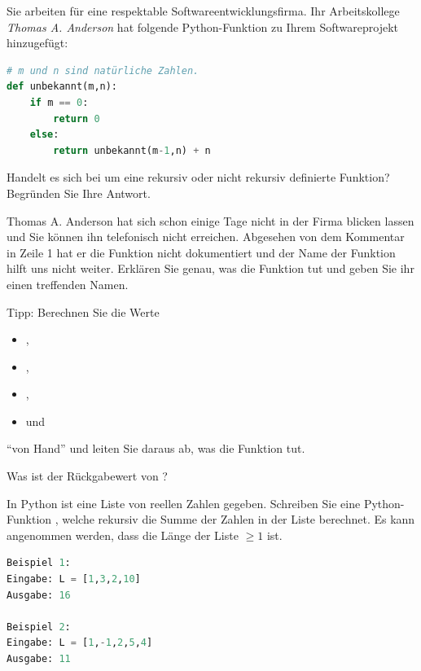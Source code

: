 \begin{myexercise}\label{myexercise:0304}
Sie arbeiten für eine respektable Softwareentwicklungsfirma. Ihr Arbeitskollege \textit{Thomas A. Anderson} hat folgende Python-Funktion zu Ihrem Softwareprojekt hinzugefügt:
\begin{lstlisting}[language=Python]
# m und n sind natürliche Zahlen.
def unbekannt(m,n):
    if m == 0:
        return 0
    else:
        return unbekannt(m-1,n) + n
\end{lstlisting}
\begin{aenum}
    \item Handelt es sich bei  um eine rekursiv oder nicht rekursiv definierte Funktion? Begründen Sie Ihre Antwort.
    \item Thomas A. Anderson hat sich schon einige Tage nicht in der Firma blicken lassen und Sie können ihn telefonisch nicht erreichen. Abgesehen von dem Kommentar in Zeile 1 hat er die Funktion  nicht dokumentiert und der Name der Funktion hilft uns nicht weiter. Erklären Sie genau, was die Funktion tut und geben Sie ihr einen treffenden Namen.
    
    \noindent
    Tipp: Berechnen Sie die Werte
    \begin{itemize}
        \item {},
        \item {},
        \item {},
        \item und 
    \end{itemize}
    \enquote{von Hand} und leiten Sie daraus ab, was die Funktion tut.
    \item Was ist der Rückgabewert von ?
\end{aenum}
\end{myexercise}

\clearpage
\begin{myexercise}\label{myexercise:0305}
In Python ist eine Liste  von reellen Zahlen gegeben. Schreiben Sie eine Python-Funktion , welche rekursiv die Summe der Zahlen in der Liste berechnet. Es kann angenommen werden, dass die Länge der Liste $\geq 1$ ist.
\begin{lstlisting}[language=Python]
Beispiel 1:
Eingabe: L = [1,3,2,10]
Ausgabe: 16

Beispiel 2:
Eingabe: L = [1,-1,2,5,4]
Ausgabe: 11
\end{lstlisting}
\end{myexercise}

